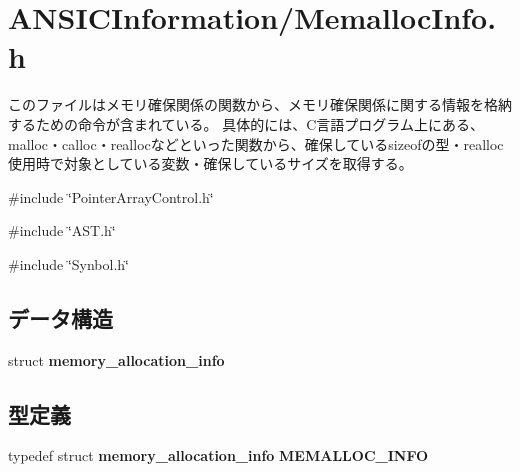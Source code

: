 \section{ANSICInformation/MemallocInfo.h}
\label{MemallocInfo_8h}


このファイルはメモリ確保関係の関数から、メモリ確保関係に関する情報を格納するための命令が含まれている。 具体的には、C言語プログラム上にある、malloc・calloc・reallocなどといった関数から、確保しているsizeofの型・realloc使用時で対象としている変数・確保しているサイズを取得する。  


{\ttfamily \#include \char`\"{}PointerArrayControl.h\char`\"{}}\par
{\ttfamily \#include \char`\"{}AST.h\char`\"{}}\par
{\ttfamily \#include \char`\"{}Synbol.h\char`\"{}}\par
\subsection*{データ構造}
\begin{DoxyCompactItemize}
\item 
struct {\bf memory\_\-allocation\_\-info}
\end{DoxyCompactItemize}
\subsection*{型定義}
\begin{DoxyCompactItemize}
\item 
typedef struct {\bf memory\_\-allocation\_\-info} {\bf MEMALLOC\_\-INFO}
\end{DoxyCompactItemize}
